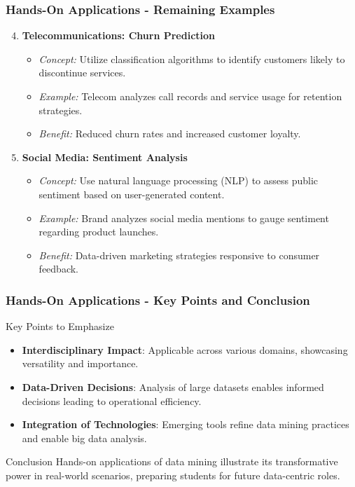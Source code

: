 \documentclass{beamer}
\begin{document}
\begin{frame}[fragile]
    \frametitle{Hands-On Applications - Remaining Examples}
    \begin{enumerate}
        \setcounter{enumi}{3} %
        \item \textbf{Telecommunications: Churn Prediction}
            \begin{itemize}
                \item \textit{Concept:} Utilize classification algorithms to identify customers likely to discontinue services.
                \item \textit{Example:} Telecom analyzes call records and service usage for retention strategies.
                \item \textit{Benefit:} Reduced churn rates and increased customer loyalty.
            \end{itemize}

        \item \textbf{Social Media: Sentiment Analysis}
            \begin{itemize}
                \item \textit{Concept:} Use natural language processing (NLP) to assess public sentiment based on user-generated content.
                \item \textit{Example:} Brand analyzes social media mentions to gauge sentiment regarding product launches.
                \item \textit{Benefit:} Data-driven marketing strategies responsive to consumer feedback.
            \end{itemize}
    \end{enumerate}
\end{frame}

\begin{frame}[fragile]
    \frametitle{Hands-On Applications - Key Points and Conclusion}
    \begin{block}{Key Points to Emphasize}
        \begin{itemize}
            \item \textbf{Interdisciplinary Impact}: Applicable across various domains, showcasing versatility and importance.
            \item \textbf{Data-Driven Decisions}: Analysis of large datasets enables informed decisions leading to operational efficiency.
            \item \textbf{Integration of Technologies}: Emerging tools refine data mining practices and enable big data analysis.
        \end{itemize}
    \end{block}

    \begin{block}{Conclusion}
        Hands-on applications of data mining illustrate its transformative power in real-world scenarios, preparing students for future data-centric roles.
    \end{block}
\end{frame}
\end{document}
